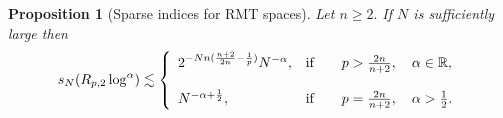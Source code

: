 \documentclass[11pt, a4paper,leqno]{amsart}
\theoremstyle{plain}
\newtheorem{corollary}{Corollary}
\newtheorem{proposition}{Proposition}
\numberwithin{equation}{section}
\theoremstyle{definition}
\theoremstyle{remark}
\newtheorem{remark}{Remark}
\def\R{\mathbb{R}}
\begin{document}
%
%
%






\begin{proposition}[Sparse indices for RMT spaces] \label{ThmSparseCongruentTadmor}
Let $n\geq2.$  If $N$ is sufficiently large then
\[
s_{N}(R_{p, 2} \log^\alpha) \lesssim \left\{
\begin{array}
[c]{ll}%
 2^{-Nn(\frac{n+2}{2n}-\frac{1}{p})} N^{-\alpha}, & \text{if}\qquad p>\frac{2n}{n+2}, \quad \alpha \in \R,\\
& \\
N^{-\alpha + \frac{1}{2}}, &
\text{if}\qquad p = \frac{2n}{n+2}, \quad \alpha > \frac{1}{2}.
\end{array}
\right.
\]

%
\end{proposition}
\end{document}
